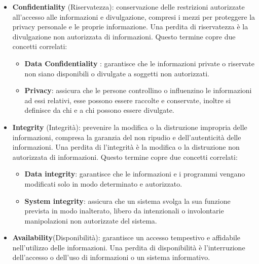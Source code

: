 \begin{itemize}
    \item \textbf{Confidentiality} (Riservatezza):  conservazione delle restrizioni autorizzate all'accesso alle informazioni e divulgazione, compresi i mezzi per proteggere la privacy personale e le proprie informazione. Una perdita di riservatezza è la divulgazione non autorizzata di informazioni. Questo termine copre due concetti correlati:
    \begin{itemize}
        \item  \textbf{Data Confidentiality} : garantisce che le informazioni private o riservate non siano disponibili o divulgate a soggetti non autorizzati.
        \item \textbf{Privacy}: assicura che le persone controllino o influenzino le informazioni
        ad essi relativi, esse possono essere raccolte e conservate, inoltre si definisce da chi e a chi possono essere divulgate.
    \end{itemize}
    \item \textbf{Integrity} (Integrità): prevenire la modifica o la distruzione impropria delle informazioni, compresa la garanzia del non ripudio e dell'autenticità delle informazioni. Una perdita di l'integrità è la modifica o la distruzione non autorizzata di informazioni. Questo termine copre due concetti correlati:
    \begin{itemize}
        \item \textbf{Data integrity}:  garantisce che le informazioni e i programmi vengano modificati solo in modo determinato e autorizzato.
        \item \textbf{System integrity}: assicura che un sistema svolga la sua funzione prevista in modo inalterato, libero da intenzionali o involontarie manipolazioni non autorizzate del sistema.
    \end{itemize}
    \item \textbf{Availability}(Disponibilità): garantisce un accesso tempestivo e affidabile nell'utilizzo delle informazioni. Una perdita di disponibilità è l'interruzione dell'accesso o dell'uso di informazioni o un sistema informativo.
\end{itemize} 

